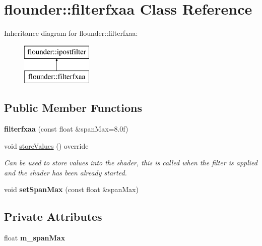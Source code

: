 \hypertarget{classflounder_1_1filterfxaa}{}\section{flounder\+:\+:filterfxaa Class Reference}
\label{classflounder_1_1filterfxaa}
Inheritance diagram for flounder\+:\+:filterfxaa\+:\begin{figure}[H]
\begin{center}
\leavevmode
\includegraphics[height=2.000000cm]{classflounder_1_1filterfxaa}
\end{center}
\end{figure}
\subsection*{Public Member Functions}
\begin{DoxyCompactItemize}
\item 
\mbox{\label{classflounder_1_1filterfxaa_a31b900725a4822fe73b92c35ad20f710}} 
{\bfseries filterfxaa} (const float \&span\+Max=8.\+0f)
\item 
void \hyperlink{classflounder_1_1filterfxaa_abee255cfd538d96881386157e6e8eea0}{store\+Values} () override
\begin{DoxyCompactList}\small\item\em Can be used to store values into the shader, this is called when the filter is applied and the shader has been already started. \end{DoxyCompactList}\item 
\mbox{\label{classflounder_1_1filterfxaa_a0d3b09024e4966bdafecbc5b388cc129}} 
void {\bfseries set\+Span\+Max} (const float \&span\+Max)
\end{DoxyCompactItemize}
\subsection*{Private Attributes}
\begin{DoxyCompactItemize}
\item 
\mbox{\label{classflounder_1_1filterfxaa_a6f59a5c3990455c2ddb30e2df9e1a140}} 
float {\bfseries m\+\_\+span\+Max}
\end{DoxyCompactItemize}
